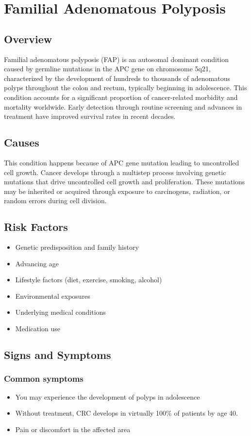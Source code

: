 \chapter{Familial Adenomatous Polyposis}
\label{sec:Familial Adenomatous Polyposis}

\section{Overview}
Familial adenomatous polyposis (FAP) is an autosomal dominant condition caused by germline mutations in the APC gene on chromosome 5q21, characterized by the development of hundreds to thousands of adenomatous polyps throughout the colon and rectum, typically beginning in adolescence. This condition accounts for a significant proportion of cancer-related morbidity and mortality worldwide. Early detection through routine screening and advances in treatment have improved survival rates in recent decades.
\section{Causes}
This condition happens because of APC gene mutation leading to uncontrolled cell growth. Cancer develops through a multistep process involving genetic mutations that drive uncontrolled cell growth and proliferation. These mutations may be inherited or acquired through exposure to carcinogens, radiation, or random errors during cell division.    
\section{Risk Factors}

\begin{itemize}[noitemsep]
  \item Genetic predisposition and family history
  \item Advancing age
  \item Lifestyle factors (diet, exercise, smoking, alcohol)
  \item Environmental exposures
  \item Underlying medical conditions
  \item Medication use
\end{itemize}
\section{Signs and Symptoms}

\subsection{Common symptoms}
\begin{itemize}[noitemsep]
  \item You may experience the development of polyps in adolescence
  \item Without treatment, CRC develops in virtually 100\% of patients by age 40.
  \item Pain or discomfort in the affected area
  \end{itemize}

